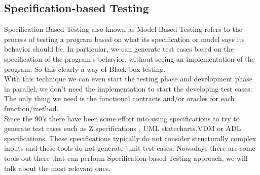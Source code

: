 \documentclass[10pt, conference, compsocconf]{IEEEtran}
\begin{document}
\subsection{Specification-based Testing}
Specification Based Testing also known as Model Based Testing refers to the process of testing a program based on what its specification or model says its behavior should be.
In particular, we can generate test cases based on the specification of the program's behavior, without seeing an implementation of the program. So this clearly a
way of Black-box testing.\\
With this technique we can even start the testing phase and development phase in parallel, we don't need the implementation
to start the developing test cases. The only thing we need is the functional contracts and/or oracles for each function/method.\\
Since the 90's there have been some effort into using specifications to try to generate test cases such as Z specifications
\cite{Horcher95improvingsoftware,Stocks:1996:FST:239916.239918}, UML statecharts\cite{Offutt:1999:GTU:1767297.1767341},VDM\cite{Aichernig99automatedblack-box}
or ADL specifications\cite{Sankar94specifyingand}.
These specifications typically do not consider structurally complex inputs and these tools do not generate junit test cases.
Nowadays there are some tools out there that can perform Specification-based Testing approach, we will talk about the most relevant ones.
\end{document}
